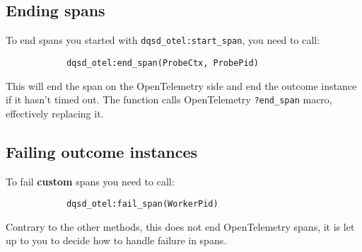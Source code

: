     \subsection{Ending spans}
        To end spans you started with \texttt{dqsd\_otel:start\_span}, you need to call:
        \begin{verbatim}
            dqsd_otel:end_span(ProbeCtx, ProbePid)
        \end{verbatim}
        This will end the span on the OpenTelemetry side and end the outcome instance if it hasn't timed out.
        The function calls OpenTelemetry \texttt{?end\_span} macro, effectively replacing it.
    \subsection{Failing outcome instances}
        To fail \textbf{custom} spans you need to call:
        \begin{verbatim}
            dqsd_otel:fail_span(WorkerPid)
        \end{verbatim}
        Contrary to the other methods, this does not end OpenTelemetry spans, it is let up to you to decide how to handle failure in spans.


